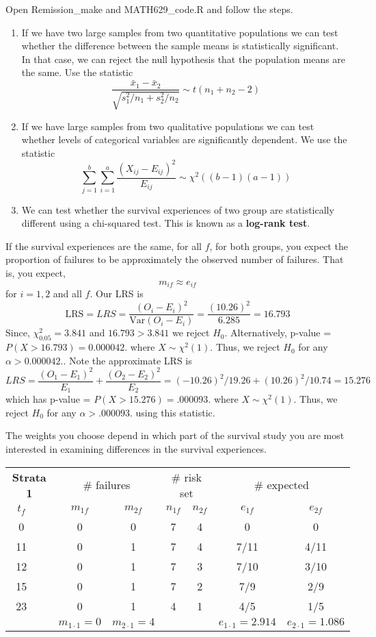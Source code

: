 \documentclass{article}
\begin{document}
Open Remission\_make and MATH629\_code.R and follow the steps.


\begin{enumerate}
\item If we have two large samples from two quantitative populations we can test whether the difference between the sample means is statistically significant. In that case, we can reject the null hypothesis that the population means are the same. Use the statistic
\[
\frac{\bar{x}_1 - \bar{x}_2}{\sqrt{s_1^2/n_1 + s_2^2/n_2}} \sim t(n_1+n_2-2)
\]
\item If we have large samples from two qualitative populations we can test whether levels of categorical variables are significantly dependent. We use the statistic
\[
  \sum_{j=1}^b \sum_{i=1}^a \frac{(X_{ij}-E_{ij})^2}{E_{ij}} \sim \chi^2((b-1)(a-1))
  \]
\item We can test whether the survival experiences of two group are statistically different using a chi-squared test. This is known as a \textbf{log-rank test}.
\end{enumerate}

 If the survival experiences are the same, for all $f$, for both groups, you expect the proportion of failures to be approximately the observed number of failures. That is, you expect,
\[
m_{if} \approx e_{if}
\]
for $i=1,2$ and all $f$.
Our LRS is
\[
\text{LRS} = LRS = \frac{(O_i - E_i)^2}{\text{Var}(O_i-E_i)} = \frac{(10.26)^2}{6.285} = 16.793
\]
Since, $\chi^2_{0.05} = 3.841$ and $16.793>3.841$ we reject $H_0$. Alternatively,
p-value = $P(X > 16.793) =  0.000042.$ where $X \sim \chi^2(1)$. Thus, we reject $H_0$ for any $\alpha>0.000042.$.
Note the approximate LRS is
\[
LRS = \frac{(O_1 - E_1)^2}{E_1} + \frac{(O_2 - E_2)^2}{E_2} = (-10.26)^2/19.26 + (10.26)^2/10.74 = 15.276
\]
which has p-value = $P(X > 15.276) =  .000093.$ where $X \sim \chi^2(1)$. Thus, we reject $H_0$ for any $\alpha>.000093.$ using this statistic.

The weights you choose depend in which part of the survival study you are most interested in examining differences in the survival experiences.

\begin{center}
\begin{tabular}{ c c c c c c c c}
\multicolumn{2}{c}{\textbf{Strata 1}} & \multicolumn{2}{c}{\# failures} & \multicolumn{2}{c}{\# risk set} & \multicolumn{2}{c}{\# expected} \\
 $t_{f}$ & & $m_{1f}$ & $m_{2f}$ & $n_{1f}$ & $n_{2f}$ & $e_{1f}$ & $e_{2f}$ \\ \hline
0 & & 0 & 0  & 7 & 4 & 0 & 0 \\
11 & & 0 & 1 & 7 & 4 & 7/11 & 4/11 \\
12 & & 0 & 1 & 7 & 3 & 7/10 & 3/10 \\
15 & & 0 & 1 & 7 & 2 & 7/9 & 2/9 \\
23 & & 0 & 1 & 4 & 1 & 4/5 & 1/5 \\ \hline
 &&  $m_{1 \cdot 1}=0$&$m_{2 \cdot 1}=4$ & & & $e_{1 \cdot 1} = 2.914$ & $e_{2 \cdot 1}=1.086$
\end{tabular}
\end{center}
\end{document}
